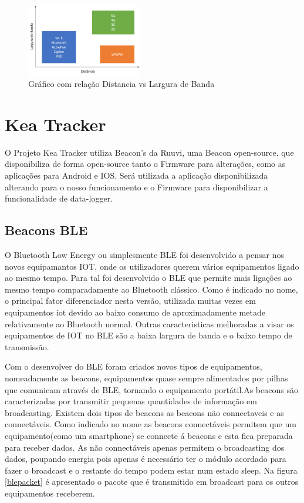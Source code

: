 \begin{figure}[ht]
  \centering
  \includegraphics[width=0.45\textwidth]{images/lpwan.png}
  \caption{Gráfico com relação Distancia vs Largura de Banda\cite{masterthesisLPWAN}}\label{figgraphlpwan}
\end{figure}



\section {Kea Tracker}\label{kea}
O Projeto Kea Tracker utiliza Beacon’s da Ruuvi, uma Beacon open-source\cite{ruuvi}, que disponibiliza de forma open-source tanto o  Firmware para alterações, como as aplicações para Android e IOS. Será utilizada a aplicação disponibilizada alterando para o nosso funcionamento e o Firmware para disponibilizar a funcionalidade de data-logger.
\subsection{Beacons BLE}
\par
O Bluetooth Low Energy ou simplesmente BLE foi desenvolvido a pensar nos novos equipamantos IOT, onde os utilizadores querem vários equipamentos ligado ao mesmo tempo. Para tal foi desenvolvido o BLE que permite mais ligações ao mesmo tempo comparadamente ao Bluetooth clássico.
Como é indicado no nome, o principal fator diferenciador nesta versão, utilizada muitas vezes em equipamentos iot devido ao baixo consumo de aproximadamente metade relativamente ao Bluetooth normal. Outras caracteristicas melhoradas a visar os equipamentos de IOT no BLE são a baixa largura de banda e o baixo tempo de transmissão.

Com o desenvolver do BLE foram criados novos tipos de equipamentos, nomeadamente as beacons, equipamentos quase sempre alimentados por pilhas que comunicam através de BLE, tornando o equipamento portátil.As beacons são caracterizadas por transmitir pequenas quantidades de informação em broadcasting.
Existem dois tipos de beacons as beacons não connectaveis e as connectáveis. Como indicado no nome as beacons connectáveis permitem que um equipamento(como um smartphone) se connecte á beacons e esta fica preparada para receber dados. As não connectáveis apenas permitem o broadcasting dos dados, poupando energia pois apenas é necessário ter o módulo acordado para fazer o broadcast e o restante do tempo podem estar num estado sleep. Na figura \ref{blepacket} é apresentado o pacote que é transmitido em broadcast para os outros equipamentos receberem.

